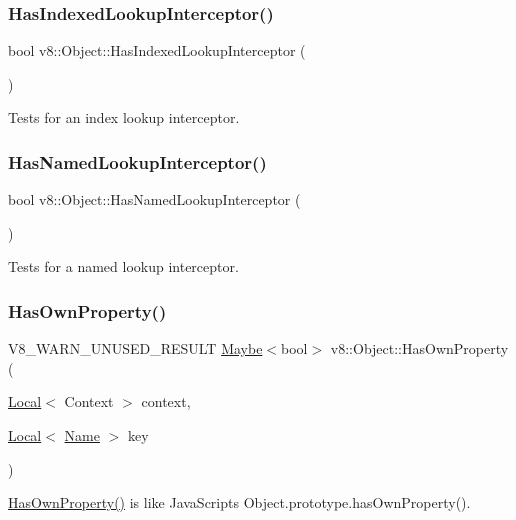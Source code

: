 \subsubsection{\texorpdfstring{Has\+Indexed\+Lookup\+Interceptor()}{HasIndexedLookupInterceptor()}}
{\footnotesize\ttfamily bool v8\+::\+Object\+::\+Has\+Indexed\+Lookup\+Interceptor (\begin{DoxyParamCaption}{ }\end{DoxyParamCaption})}

Tests for an index lookup interceptor. \mbox{\label{classv8_1_1Object_a1e96fcb9ee17101c0299ec68f2cf8610}} 
\subsubsection{\texorpdfstring{Has\+Named\+Lookup\+Interceptor()}{HasNamedLookupInterceptor()}}
{\footnotesize\ttfamily bool v8\+::\+Object\+::\+Has\+Named\+Lookup\+Interceptor (\begin{DoxyParamCaption}{ }\end{DoxyParamCaption})}

Tests for a named lookup interceptor. \mbox{\label{classv8_1_1Object_acdd3921e95d5bb1a27cea489792607ff}} 
\subsubsection{\texorpdfstring{Has\+Own\+Property()}{HasOwnProperty()}}
{\footnotesize\ttfamily V8\+\_\+\+W\+A\+R\+N\+\_\+\+U\+N\+U\+S\+E\+D\+\_\+\+R\+E\+S\+U\+LT \mbox{\hyperlink{classv8_1_1Maybe}{Maybe}}$<$bool$>$ v8\+::\+Object\+::\+Has\+Own\+Property (\begin{DoxyParamCaption}\item[{\mbox{\hyperlink{classv8_1_1Local}{Local}}$<$ Context $>$}]{context,  }\item[{\mbox{\hyperlink{classv8_1_1Local}{Local}}$<$ \mbox{\hyperlink{classv8_1_1Name}{Name}} $>$}]{key }\end{DoxyParamCaption})}

\mbox{\hyperlink{classv8_1_1Object_acdd3921e95d5bb1a27cea489792607ff}{Has\+Own\+Property()}} is like Java\+Script\textquotesingle{}s Object.\+prototype.\+has\+Own\+Property().


